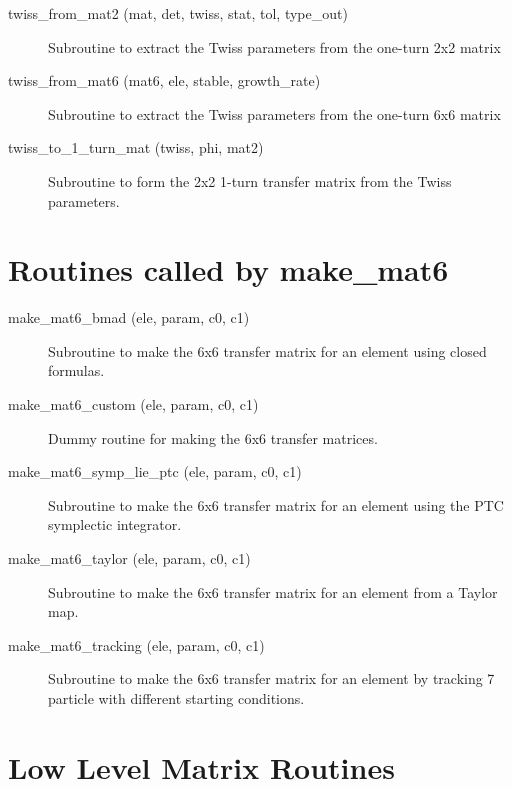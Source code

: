 \begin{description}
\item[twiss\_from\_mat2 (mat, det, twiss, stat, tol, type\_out)] \Newline
Subroutine to extract the Twiss parameters from the one-turn 2x2 matrix 

\item[twiss\_from\_mat6 (mat6, ele, stable, growth\_rate)] \Newline
Subroutine to extract the Twiss parameters from the one-turn 6x6 matrix 

\item[twiss\_to\_1\_turn\_mat (twiss, phi, mat2)] \Newline
Subroutine to form the 2x2 1-turn transfer matrix from the Twiss parameters. 

\end{description}

\section{Routines called by make\_mat6}
\label{r:mat6}

\begin{description}

\item[make\_mat6\_bmad (ele, param, c0, c1)] \Newline
Subroutine to make the 6x6 transfer matrix for an element
using closed formulas.

\item[make\_mat6\_custom (ele, param, c0, c1)] \Newline
Dummy routine for making the 6x6 transfer matrices.

\item[make\_mat6\_symp\_lie\_ptc (ele, param, c0, c1)] \Newline
Subroutine to make the 6x6 transfer matrix for an element using
the PTC symplectic integrator.

\item[make\_mat6\_taylor (ele, param, c0, c1)] \Newline
Subroutine to make the 6x6 transfer matrix for an element
from a Taylor map.

\item[make\_mat6\_tracking (ele, param, c0, c1)] \Newline
Subroutine to make the 6x6 transfer matrix for an element by 
tracking 7 particle with different starting conditions.

\end{description}

\section{Low Level Matrix Routines}
\label{r:low_mat}  

